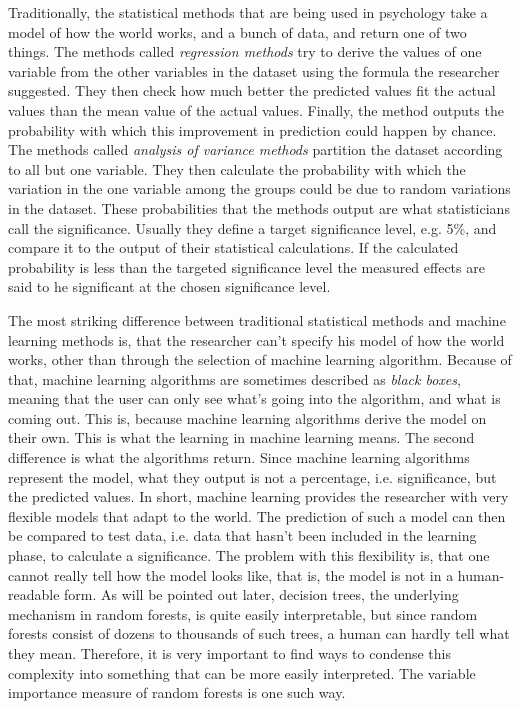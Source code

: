 \documentclass[a4paper,man,12pt,apacite]{apa6} %
\begin{document}
Traditionally, the statistical methods that are being used in psychology
take a model of how the world works, and a bunch of data, and return one of
two things.
The methods called \emph{regression methods} try to derive the values of
one variable from the other variables in the dataset using the formula the
researcher suggested. They then check how much better the predicted values
fit the actual values than the mean value of the actual values.
Finally, the method outputs the probability with which this improvement in
prediction could happen by chance.
The methods called \emph{analysis of variance methods} partition the dataset
according to all but one variable. They then calculate the probability with
which the variation in the one variable among the groups could be due to
random variations in the dataset.
These probabilities that the methods output are what statisticians call the
significance. Usually they define a target significance level, e.g. 5\%, and
compare it to the output of their statistical calculations. If the
calculated probability is less than the targeted significance level the
measured effects are said to he significant at the chosen significance level.

The most striking difference between traditional statistical methods and
machine learning methods is, that the researcher can't specify his model of
how the world works, other than through the selection of machine learning
algorithm.
Because of that, machine learning algorithms are sometimes described as
\emph{black boxes}, meaning that the user can only see what's going into the
algorithm, and what is coming out.
This is, because machine learning algorithms derive the model on their own.
This is what the learning in machine learning means.
The second difference is what the algorithms return.
Since machine learning algorithms represent the model, what they output is
not a percentage, i.e. significance, but the predicted values.
In short, machine learning provides the researcher with very flexible models
that adapt to the world.
The prediction of such a model can then be compared to test data,
i.e. data that hasn't been included in the learning phase, to calculate a
significance.
The problem with this flexibility is, that one cannot really tell how the
model looks like, that is, the model is not in a human-readable form.
As will be pointed out later, decision trees, the underlying mechanism in
random forests, is quite easily interpretable, but since random forests
consist of dozens to thousands of such trees, a human can hardly tell what
they mean.
Therefore, it is very important to find ways to condense this complexity
into something that can be more easily interpreted.
The variable importance measure of random forests is one such way.
\end{document}
